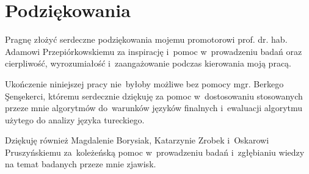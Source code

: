     \thispagestyle{empty}
    \setcounter{page}{3}

\chapter*{Podziękowania}

Pragnę złożyć serdeczne podziękowania mojemu promotorowi prof. dr. hab. Adamowi Przepiórkowskiemu za inspirację i~pomoc w~prowadzeniu badań oraz cierpliwość, wyrozumiałość i~zaangażowanie podczas kierowania moją pracą.

Ukończenie niniejszej pracy nie~byłoby możliwe bez pomocy mgr. Berkego \c{S}en\c{s}ekerci, któremu serdecznie dziękuję za pomoc w~dostosowaniu stosowanych przeze mnie algorytmów do~warunków języków finalnych i~ewaluacji algorytmu użytego do analizy języka tureckiego.

Dziękuję również Magdalenie Borysiak, Katarzynie Zrobek i~Oskarowi Pruszyńskiemu za~koleżeńską pomoc w~prowadzeniu badań i~zgłębianiu wiedzy na temat badanych przeze mnie zjawisk.
    
    \tableofcontents